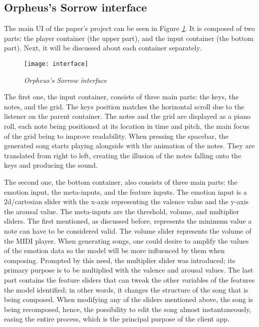 \subsection{Orpheus's Sorrow interface}

The main UI of the paper's project can be seen in Figure \emph{\ref{fig:interface}}.
It is composed of two parts: the player container (the upper part),
and the input container (the bottom part).
Next, it will be discussed about each container separately.

\begin{figure}[h]
  \centering
  \texttt{[image: interface]}
  \caption{\emph{Orpheus's Sorrow interface}}
  \label{fig:interface}
\end{figure}


The first one, the input container,
consists of three main parts: the keys, the notes, and the grid.
The keys position matches the horizontal scroll due to the listener
on the parent container.
The notes and the grid are displayed as a piano roll,
each note being positioned at its location in time and pitch,
the main focus of the grid being to improve readability.
When pressing the spacebar,
the generated song starts playing alongside with the animation of the notes.
They are translated from right to left,
creating the illusion of the notes falling onto the keys and producing
the sound.

The second one, the bottom container,
also consists of three main parts: the emotion input, the meta-inputs,
and the feature inputs.
The emotion input is a 2d/cartesian slider with the x-axis
representing the valence value and the y-axis the arousal value.
The meta-inputs are the threshold, volume, and multiplier sliders.
The first mentioned, as discussed before,
represents the minimum value a note can have to be considered valid.
The volume slider represents the volume of the MIDI player.
When generating songs,
one could desire to amplify the values of the emotion data so the model will be more
influenced by them when composing.
Prompted by this need, the multiplier slider was introduced;
its primary purpose is to be multiplied with the valence and arousal values.
The last part contains the feature sliders that can tweak the other
variables of the features the model identified; in other words,
it changes the structure of the song that is being composed.
When modifying any of the sliders mentioned above, the song is being recomposed,
hence, the possibility to edit the song almost instantaneously,
easing the entire process, which is the principal purpose of the client app.